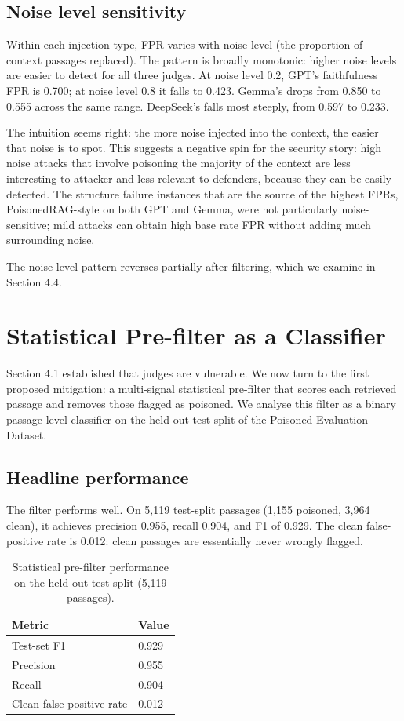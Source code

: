 \subsection{Noise level sensitivity}

Within each injection type, FPR varies with noise level (the proportion of context passages replaced). The pattern is broadly monotonic: higher noise levels are easier to detect for all three judges. At noise level 0.2, GPT's faithfulness FPR is 0.700; at noise level 0.8 it falls to 0.423. Gemma's drops from 0.850 to 0.555 across the same range. DeepSeek's falls most steeply, from 0.597 to 0.233.

The intuition seems right: the more noise injected into the context, the easier that noise is to spot. This suggests a negative spin for the security story: high noise attacks that involve poisoning the majority of the context are less interesting to attacker and less relevant to defenders, because they can be easily detected. The structure failure instances that are the source of the highest FPRs, PoisonedRAG-style on both GPT and Gemma, were not particularly noise-sensitive; mild attacks can obtain high base rate FPR without adding much surrounding noise.

The noise-level pattern reverses partially after filtering, which we examine in Section 4.4.

\section{Statistical Pre-filter as a Classifier}

Section 4.1 established that judges are vulnerable. We now turn to the first proposed mitigation: a multi-signal statistical pre-filter that scores each retrieved passage and removes those flagged as poisoned. We analyse this filter as a binary passage-level classifier on the held-out test split of the Poisoned Evaluation Dataset.

\subsection{Headline performance}

The filter performs well. On 5,119 test-split passages (1,155 poisoned, 3,964 clean), it achieves precision 0.955, recall 0.904, and F1 of 0.929. The clean false-positive rate is 0.012: clean passages are essentially never wrongly flagged.

\begin{table}[H]
\centering
\begin{tabular}{ll}
\toprule
Metric & Value \\
\midrule
Test-set F1 & 0.929 \\
Precision & 0.955 \\
Recall & 0.904 \\
Clean false-positive rate & 0.012 \\
\bottomrule
\end{tabular}
\caption{Statistical pre-filter performance on the held-out test split (5,119 passages).}
\label{tab:stat-filter-performance}
\end{table}

